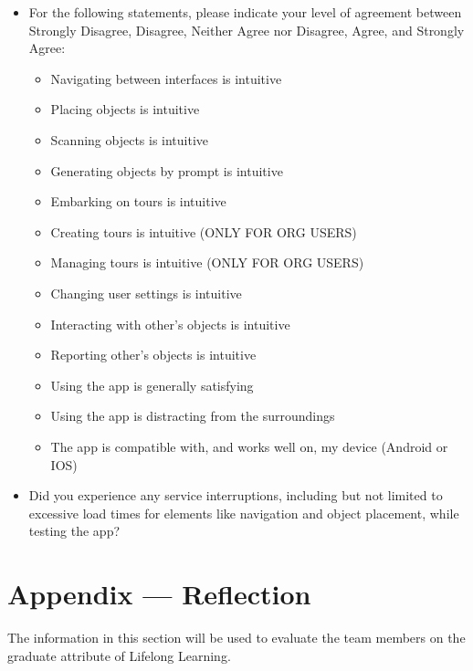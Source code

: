 \documentclass[12pt, titlepage]{article}
\begin{document}
\begin{itemize}
  \item For the following statements, please indicate your level of agreement between Strongly Disagree, Disagree, Neither Agree nor Disagree, Agree, and Strongly Agree:
        \begin{itemize}
          \item Navigating between interfaces is intuitive
          \item Placing objects is intuitive
          \item Scanning objects is intuitive
          \item Generating objects by prompt is intuitive
          \item Embarking on tours is intuitive
          \item Creating tours is intuitive (ONLY FOR ORG USERS)
          \item Managing tours is intuitive (ONLY FOR ORG USERS)
          \item Changing user settings is intuitive
          \item Interacting with other's objects is intuitive
          \item Reporting other's objects is intuitive
          \item Using the app is generally satisfying
          \item Using the app is distracting from the surroundings
          \item The app is compatible with, and works well on, my device (Android or IOS)
        \end{itemize}
  \item Did you experience any service interruptions, including but not limited to excessive load times for elements like navigation and object placement, while testing the app? \\
\end{itemize}

\newpage{}
\section*{Appendix --- Reflection}

The information in this section will be used to evaluate the team members on the
graduate attribute of Lifelong Learning.


\end{document}
